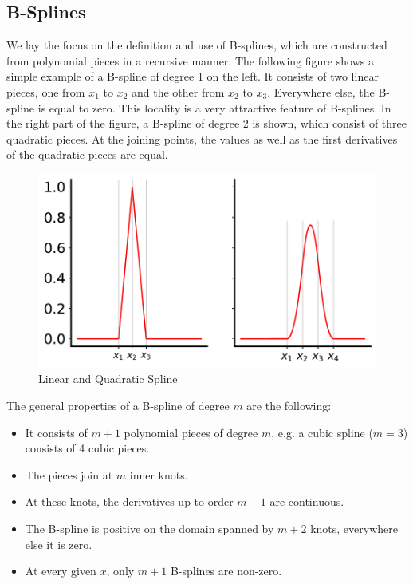 \documentclass[10pt,a4paper]{article}
\begin{document}
\subsection{B-Splines}

We lay the focus on the definition and use of B-splines, which are constructed from polynomial pieces in a recursive manner. The following figure shows a simple example of a B-spline of degree 1 on the left. It consists of two linear pieces, one from $x_1$ to $x_2$ and the other from $x_2$ to $x_3$. Everywhere else, the B-spline is equal to zero. This locality is a very attractive feature of B-splines. In the right part of the figure, a B-spline of degree 2 is shown, which consist of three quadratic pieces. At the joining points, the values as well as the first derivatives of the quadratic pieces are equal. 

\begin{figure}[H]
	\centering
	\includegraphics[width=\columnwidth]{../thesisplots/linear_and_quadratic_spline.pdf}
	\caption{Linear and Quadratic Spline}
	\label{fig:lin_and_quad_spline}
\end{figure}


The general properties of a B-spline of degree $m$ are the following:

\begin{itemize}
	\item It consists of $m+1$ polynomial pieces of degree $m$, e.g. a cubic spline ($m=3$) consists of 4 cubic pieces.
	\item The pieces join at $m$ inner knots.
	\item At these knots, the derivatives up to order $m-1$ are continuous.
	\item The B-spline is positive on the domain spanned by $m+2$ knots, everywhere else it is zero.
	\item At every given $x$, only $m+1$ B-splines are non-zero.
\end{itemize}
\end{document}
